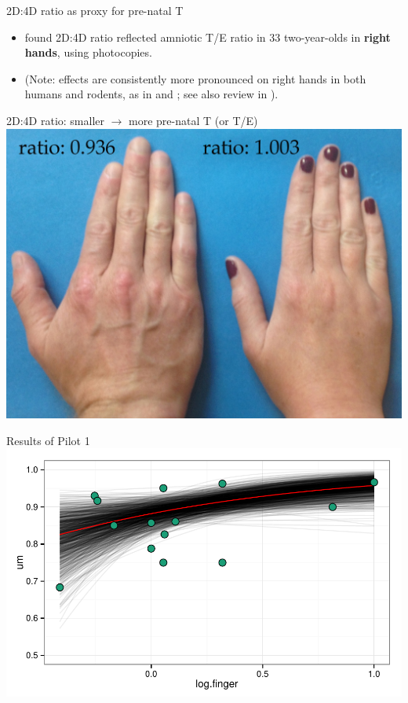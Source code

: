 \documentclass[hyperref={pdfpagelabels=false}]{beamer}
\begin{document}
\begin{frame}{2D:4D ratio as proxy for pre-natal T}
\begin{itemize}
	\item \citet{lutchmayaetal2004} found 2D:4D ratio reflected amniotic T/E ratio in 33 two-year-olds in \textbf{right hands}, using photocopies.
	\item (Note: effects are consistently more pronounced on right hands in both humans and rodents, as in \citealt{brownetal2002} and \citealt{talarovicovaetal2009}; see also review in \citealt{cohenbendahanetal2005}).
\end{itemize}

\end{frame}


\begin{frame}{2D:4D ratio: smaller $\rightarrow$ more pre-natal T (or T/E)}
	\includegraphics[width=1.12\textwidth]{figures/realhands2.jpg}
\end{frame}


\begin{frame}{Results of Pilot 1}
\includegraphics[width=1.12\textwidth]{figures/fingereffect.pdf}
\end{frame}
\end{document}
